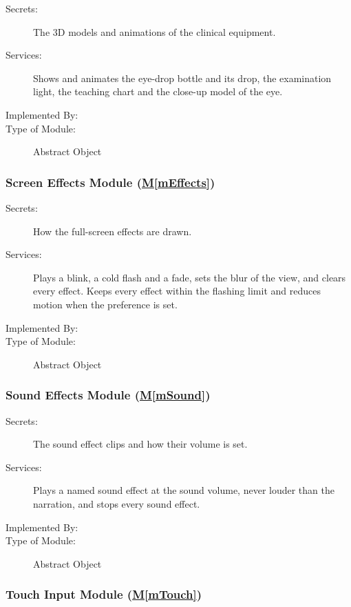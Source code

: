\documentclass[12pt, titlepage]{article}
\newcommand{\mref}[1]{\hyperref[#1]{M\ref*{#1}}}
\begin{document}
\begin{description}
\item[Secrets:] The 3D models and animations of the clinical equipment.
\item[Services:] Shows and animates the eye-drop bottle and its drop, the
  examination light, the teaching chart and the close-up model of the eye.
\item[Implemented By:] \progname{}
\item[Type of Module:] Abstract Object
\end{description}

\subsubsection{Screen Effects Module (\mref{mEffects})}

\begin{description}
\item[Secrets:] How the full-screen effects are drawn.
\item[Services:] Plays a blink, a cold flash and a fade, sets the blur of the
  view, and clears every effect. Keeps every effect within the flashing limit
  and reduces motion when the preference is set.
\item[Implemented By:] \progname{}
\item[Type of Module:] Abstract Object
\end{description}

\subsubsection{Sound Effects Module (\mref{mSound})}

\begin{description}
\item[Secrets:] The sound effect clips and how their volume is set.
\item[Services:] Plays a named sound effect at the sound volume, never louder
  than the narration, and stops every sound effect.
\item[Implemented By:] \progname{}
\item[Type of Module:] Abstract Object
\end{description}

\subsubsection{Touch Input Module (\mref{mTouch})}
\end{document}
